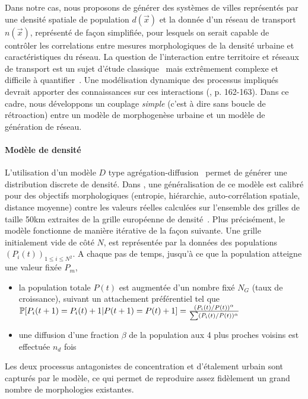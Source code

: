 Dans notre cas, nous proposons de générer des systèmes de villes représentés par une densité spatiale de population $d(\vec{x})$ et la donnée d'un réseau de transport $n(\vec{x})$, représenté de façon simplifiée, pour lesquels on serait capable de contrôler les correlations entre mesures morphologiques de la densité urbaine et caractéristiques du réseau. La question de l'interaction entre territoire et réseaux de transport est un sujet d'étude classique~\cite{offner1996reseaux} mais extrêmement complexe et difficile à quantifier~\cite{offner1993effets}. Une modélisation dynamique des processus impliqués devrait apporter des connaissances sur ces interactions (\cite{bretagnolle:tel-00459720}, p. 162-163). Dans ce cadre, nous développons un couplage \emph{simple} (c'est à dire sans boucle de rétroaction) entre un modèle de morphogenèse urbaine et un modèle de génération de réseau.


\paragraph{Modèle de densité}

L'utilisation d'un modèle $D$ type agrégation-diffusion~\cite{batty2006hierarchy} permet de générer une distribution discrete de densité. Dans \cite{raimbault2016calibration}, une généralisation de ce modèle est calibré pour des objectifs morphologiques (entropie, hiérarchie, auto-corrélation spatiale, distance moyenne) contre les valeurs réelles calculées sur l'ensemble des grilles de taille 50km extraites de la grille européenne de densité~\cite{eurostat}. Plus précisément, le modèle fonctionne de manière itérative de la façon suivante. Une grille initialement vide de côté $N$, est représentée par la données des populations $(P_i(t))_{1\leq i\leq N^2}$. A chaque pas de temps, jusqu'à ce que la population atteigne une valeur fixée $P_m$,
\begin{itemize}
\item la population totale $P(t)$ est augmentée d'un nombre fixé $N_G$ (taux de croissance), suivant un attachement préférentiel tel que $\operatorname{\mathbb{P}}\!\left[P_i(t+1)=P_i(t)+1|P(t+1)=P(t)+1\right]=\frac{(P_i(t)/P(t))^{\alpha}}{\sum(P_i(t)/P(t))^{\alpha}}$
\item une diffusion d'une fraction $\beta$ de la population aux 4 plus proches voisins est effectuée $n_d$ fois
\end{itemize}

Les deux processus antagonistes de concentration et d'étalement urbain sont capturés par le modèle, ce qui permet de reproduire assez fidèlement un grand nombre de morphologies existantes.


